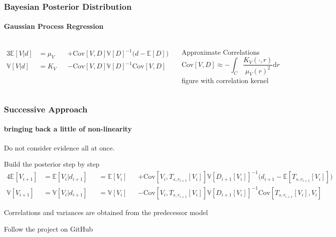\documentclass[aspectratio=169, t, 10pt]{beamer}
\newcommand\Mean[1]{\mathbb{E}\!\left[#1\right]}
\newcommand\Var[1]{\mathbb{V}\!\left[#1\right]}
\newcommand\Cov[2]{\mathrm{Cov}\!\left[#1,#2\right]}
\begin{document}
\begin{frame}
    \frametitle{Bayesian Posterior Distribution}
    \framesubtitle{Gaussian Process Regression}

\begin{columns}
    \begin{alignat}{3}
        \Mean{V|d} &= \mu_V &&+ \Cov{V}{D} \Var{D}^{-1} \big( d - \Mean{D} \big)
        \\
        \Var{V|d}  &= K_V   &&- \Cov{V}{D} \Var{D}^{-1} \Cov{V}{D}
    \end{alignat}

    Approximate Correlations
    \begin{equation}
        \Cov{V}{D} \approx -\int_C \frac {K_V(\cdot,r)}{\mu_V(r)^2} \mathrm d r
    \end{equation}
    figure with correlation kernel
\end{columns}

\end{frame}

\begin{frame}
    \frametitle{Successive Approach}
    \framesubtitle{bringing back a little of non-linearity}

    Do not consider evidence all at once.

    Build the posterior step by step
    \begin{alignat}{4}
        \Mean{V_{i+1}} &=
        \Mean{V_i|d_{i+1}} &&=
        \Mean{V_i} &&+ \Cov{V_i}{T_{s,r_{i+1}}[V_i]} \Var{D_{i+1}[V_i]}^{-1} \big(d_{i+1} - \Mean{T_{s,r_{i+1}}[V_i]} \! \big)
        \\
        \Var{V_{i+1}} &=
        \Var{V_i|d_{i+1}} &&=
        \Var{V_i}  &&- \Cov{V_i}{T_{s,r_{i+1}}[V_i]} \Var{D_{i+1}[V_i]}^{-1} \Cov{T_{s,r_{i+1}}[V_i]}{V_i}
    \end{alignat}

    Correlations and variances are obtained from the predecessor model

\end{frame}


\begin{frame}[plain]
\end{frame}

\begin{frame}
    \hspace{15mm} Follow the project on GitHub \\[1cm]
    \hfill {} \hspace{20mm}
\end{frame}
\end{document}
